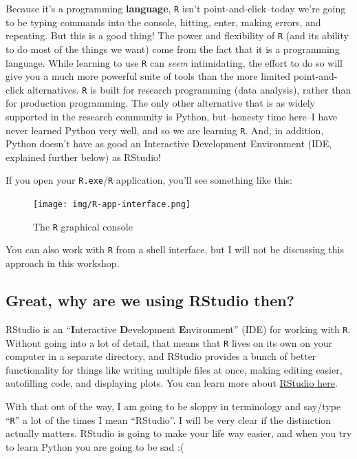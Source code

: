 \documentclass[
]{book}
\begin{document}
Because it's a programming \textbf{language}, \texttt{R} isn't point-and-click--today we're going to be typing commands into the console, hitting, enter, making errors, and repeating. But this is a good thing! The power and flexibility of \texttt{R} (and its ability to do most of the things we want) come from the fact that it is a programming language. While learning to use \texttt{R} can \emph{seem} intimidating, the effort to do so will give you a much more powerful suite of tools than the more limited point-and-click alternatives. \texttt{R} is built for research programming (data analysis), rather than for production programming. The only other alternative that is as widely supported in the research community is Python, but--honesty time here--I have never learned Python very well, and so we are learning \texttt{R}. And, in addition, Python doesn't have as good an Interactive Development Environment (IDE, explained further below) as RStudio!

If you open your \texttt{R.exe}/\texttt{R} application, you'll see something like this:

\begin{figure}
\centering
\texttt{[image: img/R-app-interface.png]}
\caption{The \texttt{R} graphical console}
\end{figure}

You can also work with \texttt{R} from a shell interface, but I will not be discussing this approach in this workshop.

\hypertarget{great-why-are-we-using-rstudio-then}{%
\subsection{Great, why are we using RStudio then?}\label{great-why-are-we-using-rstudio-then}}

RStudio is an ``\textbf{I}nteractive \textbf{D}evelopment \textbf{E}nvironment'' (IDE) for working with \texttt{R}. Without going into a lot of detail, that means that \texttt{R} lives on its own on your computer in a separate directory, and RStudio provides a bunch of better functionality for things like writing multiple files at once, making editing easier, autofilling code, and displaying plots. You can learn more about \href{https://www.rstudio.com/products/rstudio/}{RStudio here}.

With that out of the way, I am going to be sloppy in terminology and say/type ``\texttt{R}'' a lot of the times I mean ``RStudio''. I will be very clear if the distinction actually matters. RStudio is going to make your life way easier, and when you try to learn Python you are going to be sad :(
\end{document}
